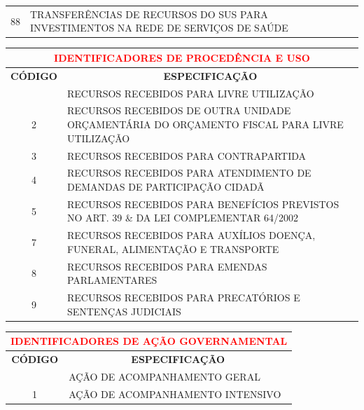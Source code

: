 \documentclass{article}
\begin{document}
\begin{longtable}[c]{m{1cm}|m{11cm}}
\multicolumn{1}{c|}{ 88 } & TRANSFERÊNCIAS DE RECURSOS DO SUS PARA INVESTIMENTOS NA REDE DE SERVIÇOS DE SAÚDE \\\end{longtable}\noindent\begin{longtable}[c]{m{1cm}|m{14cm}}\multicolumn{2}{c}{\cellcolor{gray!50} \textcolor{red} {\normalsize \textbf{ IDENTIFICADORES DE PROCEDÊNCIA E USO}}}\Tstrut  \\[2ex]\hline\hline\multicolumn{1}{c|}{\textbf{CÓDIGO}} & \multicolumn{1}{c}{\textbf{ESPECIFICAÇÃO}} \\\hline\endfirsthead\hline\endhead\endfoot\hline\hline\hline\endlastfoot\multicolumn{1}{c|}{1} & RECURSOS RECEBIDOS PARA LIVRE UTILIZAÇÃO \\\multicolumn{1}{c|}{2} & RECURSOS RECEBIDOS DE OUTRA UNIDADE ORÇAMENTÁRIA DO ORÇAMENTO FISCAL PARA LIVRE UTILIZAÇÃO \\\multicolumn{1}{c|}{3} & RECURSOS RECEBIDOS PARA CONTRAPARTIDA \\\multicolumn{1}{c|}{4} & RECURSOS RECEBIDOS PARA ATENDIMENTO DE DEMANDAS DE PARTICIPAÇÃO CIDADÃ \\\multicolumn{1}{c|}{5} & RECURSOS RECEBIDOS PARA BENEFÍCIOS PREVISTOS NO ART. 39 \& DA LEI COMPLEMENTAR 64/2002 \\\multicolumn{1}{c|}{7} & RECURSOS RECEBIDOS PARA AUXÍLIOS DOENÇA, FUNERAL, ALIMENTAÇÃO E TRANSPORTE \\\multicolumn{1}{c|}{8} & RECURSOS RECEBIDOS PARA EMENDAS PARLAMENTARES \\\multicolumn{1}{c|}{9} & RECURSOS RECEBIDOS PARA PRECATÓRIOS E SENTENÇAS JUDICIAIS \\\end{longtable}\newpage\noindent\begin{longtable}[c]{m{1cm}|m{11cm}}\multicolumn{2}{c}{\cellcolor{gray!50} \textcolor{red} {\normalsize \textbf{ IDENTIFICADORES DE AÇÃO GOVERNAMENTAL}}}\Tstrut  \\[2ex]\hline\hline\multicolumn{1}{c|}{\textbf{CÓDIGO}} & \multicolumn{1}{c}{\textbf{ESPECIFICAÇÃO}} \\\hline\endfirsthead\hline\endhead\endfoot\hline\hline\hline\endlastfoot\multicolumn{1}{c|}{0} & AÇÃO DE ACOMPANHAMENTO GERAL \\\multicolumn{1}{c|}{1} & AÇÃO DE ACOMPANHAMENTO INTENSIVO \\\end{longtable}
\end{document}
